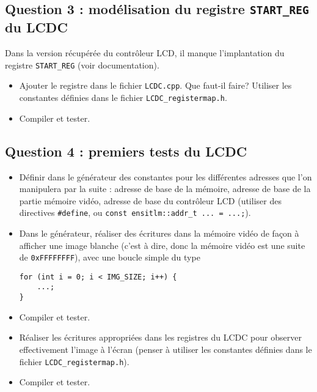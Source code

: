 \documentclass[12pt,a4paper]{article}
\begin{document}
\subsection*{Question 3 : modélisation du registre \lstinline|START_REG| du LCDC}

Dans la version récupérée du contrôleur LCD, il manque l'implantation du registre \lstinline|START_REG| (voir documentation).

\begin{itemize}
\item Ajouter le registre dans le fichier \lstinline|LCDC.cpp|.
  Que faut-il faire? Utiliser les constantes définies dans le fichier \lstinline|LCDC_registermap.h|.
\item Compiler et tester.
\end{itemize}

\subsection*{Question 4 : premiers tests du LCDC}


\begin{itemize}
\item Définir dans le générateur des constantes pour les différentes adresses que l'on manipulera par la suite : adresse de base de la mémoire, adresse de base de la partie mémoire vidéo, adresse de base du contrôleur LCD (utiliser des directives \lstinline|#define|, ou \lstinline|const ensitlm::addr_t ... = ...;|).
\item Dans le générateur, réaliser des écritures dans la mémoire vidéo de façon à afficher une image blanche (c'est à dire, donc la mémoire vidéo est une suite de \verb|0xFFFFFFFF|), avec une boucle simple du type
\begin{lstlisting}
for (int i = 0; i < IMG_SIZE; i++) {
	...;
}
\end{lstlisting}

\item Compiler et tester.
\item Réaliser les écritures appropriées dans les registres du LCDC pour observer effectivement l'image à l'écran (penser à utiliser les constantes définies dans le fichier \lstinline|LCDC_registermap.h|).
\item Compiler et tester.
\end{itemize}
\end{document}
